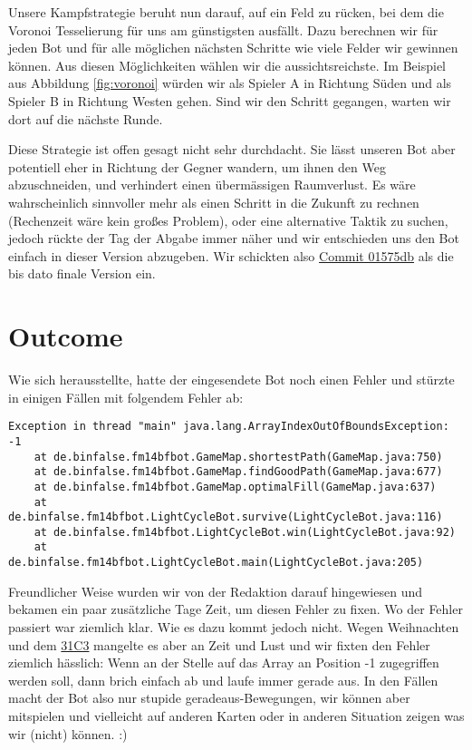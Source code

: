 Unsere Kampfstrategie beruht nun darauf, auf ein Feld zu rücken, bei dem die Voronoi Tesselierung für uns am günstigsten ausfällt.
Dazu berechnen wir für jeden Bot und für alle möglichen nächsten Schritte wie viele Felder wir gewinnen können.
Aus diesen Möglichkeiten wählen wir die aussichtsreichste.
Im Beispiel aus Abbildung \ref{fig:voronoi} würden wir als Spieler A in Richtung Süden und als Spieler B in Richtung Westen gehen.
Sind wir den Schritt gegangen, warten wir dort auf die nächste Runde.

Diese Strategie ist offen gesagt nicht sehr durchdacht.
Sie lässt unseren Bot aber potentiell eher in Richtung der Gegner wandern, um ihnen den Weg abzuschneiden, und verhindert einen übermässigen Raumverlust.
Es wäre wahrscheinlich sinnvoller mehr als einen Schritt in die Zukunft zu rechnen (Rechenzeit wäre kein großes Problem), oder eine alternative Taktik zu suchen, jedoch rückte der Tag der Abgabe immer näher und wir entschieden uns den Bot einfach in dieser Version abzugeben.
Wir schickten also \href{https://github.com/binfalse/LightCycleBot/tree/01575db895e9e18888789b397fd9277fd087fa59}{Commit 01575db} als die bis dato finale Version ein.


\newpage

\section{Outcome}
Wie sich herausstellte, hatte der eingesendete Bot noch einen Fehler und stürzte in einigen Fällen mit folgendem Fehler ab:

\lstset{language=Java,basicstyle=\scriptsize\ttfamily}
\begin{lstlisting}
Exception in thread "main" java.lang.ArrayIndexOutOfBoundsException: -1
	at de.binfalse.fm14bfbot.GameMap.shortestPath(GameMap.java:750)
	at de.binfalse.fm14bfbot.GameMap.findGoodPath(GameMap.java:677)
	at de.binfalse.fm14bfbot.GameMap.optimalFill(GameMap.java:637)
	at de.binfalse.fm14bfbot.LightCycleBot.survive(LightCycleBot.java:116)
	at de.binfalse.fm14bfbot.LightCycleBot.win(LightCycleBot.java:92)
	at de.binfalse.fm14bfbot.LightCycleBot.main(LightCycleBot.java:205)
\end{lstlisting}


Freundlicher Weise wurden wir von der Redaktion darauf hingewiesen und bekamen ein paar zusätzliche Tage Zeit, um diesen Fehler zu fixen.
Wo der Fehler passiert war ziemlich klar.
Wie es dazu kommt jedoch nicht.
Wegen Weihnachten und dem \href{}{31C3} mangelte es aber an Zeit und Lust und wir fixten den Fehler ziemlich hässlich: Wenn an der Stelle auf das Array an Position -1 zugegriffen werden soll, dann brich einfach ab und laufe immer gerade aus.
In den Fällen macht der Bot also nur stupide geradeaus-Bewegungen, wir können aber mitspielen und vielleicht auf anderen Karten oder in anderen Situation zeigen was wir (nicht) können. :)

